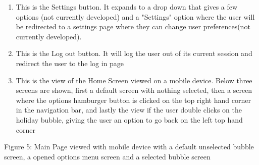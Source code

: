 \documentclass[hidelinks,english]{article}
\begin{document}
\begin{enumerate}
        \item This is the Settings button. It expands to a drop down that gives a few options (not currently developed) and a "Settings" option where the user will be redirected to a settings page where they can change user preferences(not currently developed).
        \item This is the Log out button. It will log the user out of its current session and redirect the user to the log in page
        \item This is the view of the Home Screen viewed on a mobile device. Below three screens are shown, first a default screen with nothing selected, then a screen where the options hamburger button is clicked on the top right hand corner in the navigation bar, and lastly the view if the user double clicks on the holiday bubble, giving the user an option to go back on  the left top hand corner
    \end{enumerate}
    \begin{center}
	  \caption{Figure 5: Main Page viewed with mobile device with a default unselected bubble screen, a opened options menu screen and a selected bubble screen}
	  \label{mobile page}
	\end{center}
\end{document}
